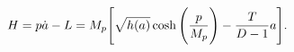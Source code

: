 \begin{equation}
H = p \dot a - L = M_p \Bigg[{\sqrt{h(a)}} \cosh \Bigg({ p \over M_p}\Bigg) -
{T
\over{D-1}}a\Bigg].
\label{ham}
\end{equation}

